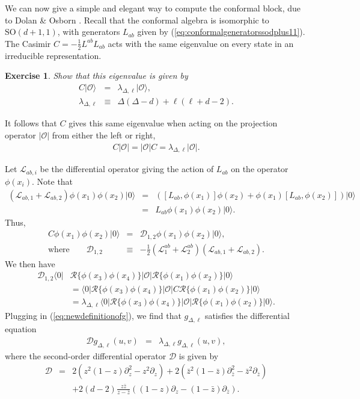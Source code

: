 \documentclass{ws-rv9x6}
\newcommand\be{\begin{eqnarray}}
\newcommand\ee{\end{eqnarray}}
\newcommand\f\phi
\newcommand\cO{\mathcal{O}}
\newcommand\p[1]{\left(#1\right)}
\newcommand\ptl\partial
\newcommand\<\langle
\renewcommand\>\rangle
\newcommand\nn{\nonumber}
\renewcommand\.{\cdot}
\newcommand\SO{\mathrm{SO}}
\newcommand\De{\Delta}
\renewcommand\l\lambda
\newcommand\cL{\mathcal{L}}
\newcommand\cD{\mathcal{D}}
\newtheorem{exercise}{Exercise}[section]
\begin{document}
We can now give a simple and elegant way to compute the conformal block, due to Dolan \& Osborn \cite{DO2}.
Recall that the conformal algebra is isomorphic to $\SO(d+1,1)$, with generators $L_{ab}$ given by (\ref{eq:conformalgeneratorssodplus11}).  The Casimir $C=-\frac 1 2 L^{ab}L_{ab}$ acts with the same eigenvalue on every state in an irreducible representation.  
\begin{exercise}
Show that this eigenvalue is given by
\be
C|\cO\> &=& \l_{\De,\ell}|\cO\>,\nn\\
\l_{\De,\ell} &\equiv& \De(\De-d)+\ell(\ell+d-2).
\ee
\end{exercise}
It follows that $C$ gives this same eigenvalue when acting on the projection operator $|\cO|$ from either the left or right,
\be
C|\cO|=|\cO| C = \l_{\De,\ell}|\cO|.
\ee

Let $\cL_{ab,i}$ be the differential operator giving the action of $L_{ab}$ on the operator $\f(x_i)$.  Note that
\be
(\cL_{ab,1}+\cL_{ab,2})\f(x_1)\f(x_2)|0\> &=& \p{[L_{ab},\f(x_1)]\f(x_2)+\f(x_1)[L_{ab},\f(x_2)]}|0\>\nn\\
&=& L_{ab}\f(x_1)\f(x_2)|0\>.
\ee
Thus, 
\be
C\f(x_1)\f(x_2)|0\> &=& \cD_{1,2}\f(x_1)\f(x_2)|0\>,\nn\\
\textrm{where}\qquad\cD_{1,2} &\equiv& -\frac 1 2(\cL^{ab}_{1}+\cL^{ab}_{2})(\cL_{ab,1}+\cL_{ab,2}).
\ee
We then have
\begin{align}
\cD_{1,2}\<0|&\mathcal{R}\{\f(x_3)\f(x_4)\}|\cO|\mathcal{R}\{\f(x_1)\f(x_2)\}|0\>\nn\\
&=
\<0|\mathcal{R}\{\f(x_3)\f(x_4)\}|\cO| C\mathcal{R}\{\f(x_1)\f(x_2)\}|0\>\nn\\
&= \l_{\De,\ell}\<0|\mathcal{R}\{\f(x_3)\f(x_4)\}|\cO|\mathcal{R}\{\f(x_1)\f(x_2)\}|0\>.
\end{align}
Plugging in (\ref{eq:newdefinitionofg}), we find that $g_{\De,\ell}$ satisfies the differential equation 
\be
\label{eq:conformalcasimir}
\cD g_{\De,\ell}(u,v) &=& \l_{\De,\ell} g_{\De,\ell}(u,v),
\ee
where the second-order differential operator $\cD$ is given by
\be
\cD &=& 2(z^2(1-z)\ptl_z^2-z^2 \ptl_z) + 2(\bar z^2 (1-\bar z)\ptl_{\bar z}^2-\bar z^2 \ptl_{\bar z})\nn\\
&& + 2(d-2)\frac{z\bar z}{z-\bar z}((1-z)\ptl_z - (1-\bar z)\ptl_{\bar z}).
\ee
\end{document}
